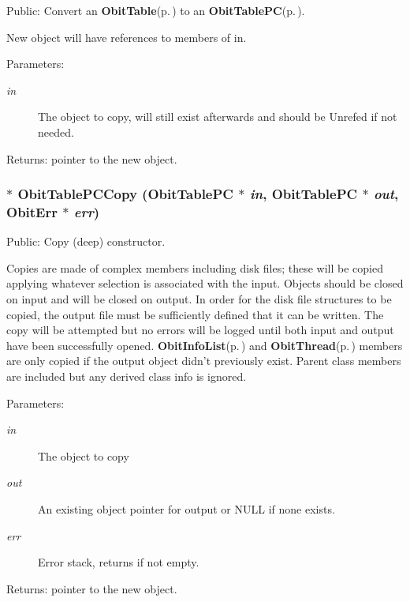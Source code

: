 Public: Convert an {\bf Obit\-Table}{\rm (p.\,\pageref{structObitTable})} to an {\bf Obit\-Table\-PC}{\rm (p.\,\pageref{structObitTablePC})}. 

New object will have references to members of in. \begin{Desc}
\item[Parameters:]
\begin{description}
\item[{\em in}]The object to copy, will still exist afterwards and should be Unrefed if not needed. \end{description}
\end{Desc}
\begin{Desc}
\item[Returns:]pointer to the new object. \end{Desc}
\subsubsection{$\ast$ Obit\-Table\-PCCopy ({\bf Obit\-Table\-PC} $\ast$ {\em in}, {\bf Obit\-Table\-PC} $\ast$ {\em out}, {\bf Obit\-Err} $\ast$ {\em err})}\label{ObitTablePC_8h_a14}


Public: Copy (deep) constructor. 

Copies are made of complex members including disk files; these will be copied applying whatever selection is associated with the input. Objects should be closed on input and will be closed on output. In order for the disk file structures to be copied, the output file must be sufficiently defined that it can be written. The copy will be attempted but no errors will be logged until both input and output have been successfully opened. {\bf Obit\-Info\-List}{\rm (p.\,\pageref{structObitInfoList})} and {\bf Obit\-Thread}{\rm (p.\,\pageref{structObitThread})} members are only copied if the output object didn't previously exist. Parent class members are included but any derived class info is ignored. \begin{Desc}
\item[Parameters:]
\begin{description}
\item[{\em in}]The object to copy \item[{\em out}]An existing object pointer for output or NULL if none exists. \item[{\em err}]Error stack, returns if not empty. \end{description}
\end{Desc}
\begin{Desc}
\item[Returns:]pointer to the new object. \end{Desc}
